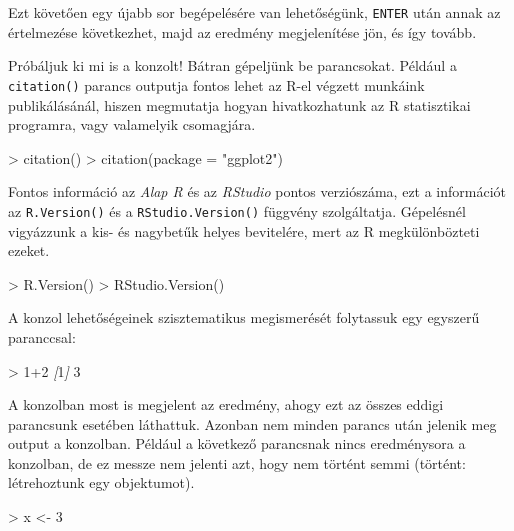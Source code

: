 \documentclass[
]{book}
\newenvironment{Shaded}{\begin{snugshade}}{\end{snugshade}}
\newcommand{\AttributeTok}[1]{\textcolor[rgb]{0.77,0.63,0.00}{#1}}
\newcommand{\CommentTok}[1]{\textcolor[rgb]{0.56,0.35,0.01}{\textit{#1}}}
\newcommand{\OtherTok}[1]{\textcolor[rgb]{0.56,0.35,0.01}{#1}}
\begin{document}
Ezt követően egy újabb sor begépelésére van lehetőségünk, \texttt{ENTER} után annak az értelmezése következhet, majd az eredmény megjelenítése jön, és így tovább.

Próbáljuk ki mi is a konzolt! Bátran gépeljünk be parancsokat. Például a \texttt{citation()} parancs outputja fontos lehet az R-el végzett munkáink publikálásánál, hiszen megmutatja hogyan hivatkozhatunk az R statisztikai programra, vagy valamelyik csomagjára.

\begin{Shaded}
\begin{Highlighting}[]
\AttributeTok{\textgreater{} citation()}
\AttributeTok{\textgreater{} citation(package = "ggplot2")}
\end{Highlighting}
\end{Shaded}

Fontos információ az \emph{Alap R} és az \emph{RStudio} pontos verziószáma, ezt a információt az \texttt{R.Version()} és a \texttt{RStudio.Version()} függvény szolgáltatja. Gépelésnél vigyázzunk a kis- és nagybetűk helyes bevitelére, mert az R megkülönbözteti ezeket.

\begin{Shaded}
\begin{Highlighting}[]
\AttributeTok{\textgreater{} R.Version()       }
\AttributeTok{\textgreater{} RStudio.Version()}
\end{Highlighting}
\end{Shaded}

A konzol lehetőségeinek szisztematikus megismerését folytassuk egy egyszerű paranccsal:

\begin{Shaded}
\begin{Highlighting}[]
\AttributeTok{\textgreater{} 1+2}
\CommentTok{[}\OtherTok{1}\CommentTok{]}\AttributeTok{ 3}
\end{Highlighting}
\end{Shaded}

A konzolban most is megjelent az eredmény, ahogy ezt az összes eddigi parancsunk esetében láthattuk. Azonban nem minden parancs után jelenik meg output a konzolban. Például a következő parancsnak nincs eredménysora a konzolban, de ez messze nem jelenti azt, hogy nem történt semmi (történt: létrehoztunk egy objektumot).

\begin{Shaded}
\begin{Highlighting}[]
\AttributeTok{\textgreater{} x \textless{}{-} 3}
\end{Highlighting}
\end{Shaded}
\end{document}
